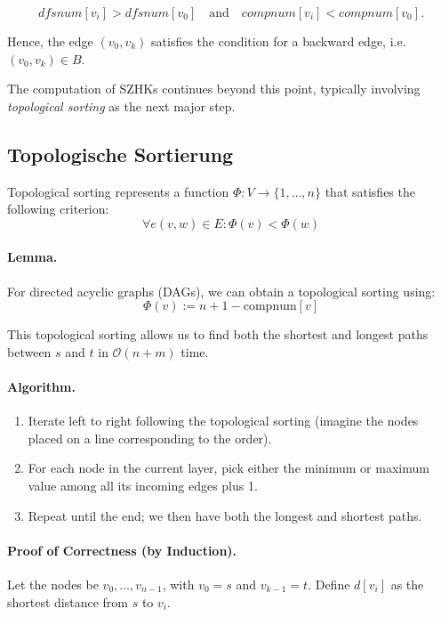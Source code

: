 \documentclass{article}
\begin{document}
\[
dfsnum[v_i] > dfsnum[v_0] \quad\text{and}\quad compnum[v_i] < compnum[v_0].
\]

\noindent
Hence, the edge $(v_0, v_k)$ satisfies the condition for a backward edge, i.e. $(v_0, v_k) \in B$.

\vspace{1em}
\noindent
The computation of SZHKs continues beyond this point, typically involving \textit{topological sorting} as the next major step.
\subsection{Topologische Sortierung}

Topological sorting represents a function $\Phi: V \rightarrow \{1, \ldots, n\}$ that satisfies the following criterion:
\[
\forall e(v, w) \in E : \Phi(v) < \Phi(w)
\]

\paragraph{Lemma.} For directed acyclic graphs (DAGs), we can obtain a topological sorting using:
\[
\Phi(v) := n + 1 - \text{compnum}[v]
\]

This topological sorting allows us to find both the shortest and longest paths between $s$ and $t$ in $\mathcal{O}(n + m)$ time.

\paragraph{Algorithm.}
\begin{enumerate}
    \item Iterate left to right following the topological sorting (imagine the nodes placed on a line corresponding to the order).
    \item For each node in the current layer, pick either the minimum or maximum value among all its incoming edges plus 1.
    \item Repeat until the end; we then have both the longest and shortest paths.
\end{enumerate}

\paragraph{Proof of Correctness (by Induction).}

Let the nodes be $v_0, \ldots, v_{n-1}$, with $v_0 = s$ and $v_{k-1} = t$.  
Define $d[v_i]$ as the shortest distance from $s$ to $v_i$.
\end{document}
